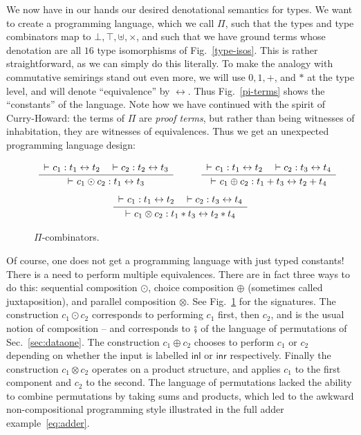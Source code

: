 \documentclass{article}
\newcommand{\iso}{\leftrightarrow}
\newcommand{\proves}{\vdash}
\newcommand{\Rule}[4]{
\makebox{{\rm #1}
$\displaystyle
\frac{\begin{array}{l}#2 \\\end{array}}
{\begin{array}{l}#3      \\\end{array}}$
 #4}}
\newcommand{\jdg}[3]{#2 \proves_{#1} #3}
\begin{document}
We now have in our hands our desired denotational semantics for types.
We want to create a programming language, which we call $\Pi$, such
that the types and type combinators map to
$\bot, \top, \uplus, \times$, and such that we have ground terms whose
denotation are all $16$ type isomorphisms of
Fig.~\ref{type-isos}. This is rather straightforward, as we can simply
do this literally. To make the analogy with commutative semirings
stand out even more, we will use $0, 1, +$, and $*$ at the type level,
and will denote ``equivalence'' by $\iso$.  Thus Fig.~\ref{pi-terms}
shows the ``constants'' of the language. Note how we have continued
with the spirit of Curry-Howard: the terms of $\Pi$ are \emph{proof
  terms}, but rather than being witnesses of inhabitation, they are
witnesses of equivalences. Thus we get an unexpected programming
language design:

\begin{center}
\end{center}
\vspace*{3mm}

\begin{figure}[t]
\[
\Rule{}
{\jdg{}{}{c_1 : t_1 \iso t_2} \quad \vdash c_2 : t_2 \iso t_3}
{\jdg{}{}{c_1 \odot c_2 : t_1 \iso t_3}}
{}
\qquad
\Rule{}
{\jdg{}{}{c_1 : t_1 \iso t_2} \quad \vdash c_2 : t_3 \iso t_4}
{\jdg{}{}{c_1 \oplus c_2 : t_1 + t_3 \iso t_2 + t_4}}
{}
\]
\[
\Rule{}
{\jdg{}{}{c_1 : t_1 \iso t_2} \quad \vdash c_2 : t_3 \iso t_4}
{\jdg{}{}{c_1 \otimes c_2 : t_1 * t_3 \iso t_2 * t_4}}
{}
\]
\caption{$\Pi$-combinators.}
\label{pi-combinators}
\end{figure}

\noindent
Of course, one does not get a programming language with just typed
constants! There is a need to perform multiple equivalences. There are
in fact three ways to do this: sequential composition $\odot$, choice
composition $\oplus$ (sometimes called juxtaposition), and parallel
composition $\otimes$. See Fig.~\ref{pi-combinators} for the
signatures. The construction $c_1 \odot c_2$ corresponds to performing
$c_1$ first, then $c_2$, and is the usual notion of composition -- and
corresponds to $\fatsemi$ of the language of permutations of
Sec.~\ref{sec:dataone}. The construction $c_1 \oplus c_2$ chooses to
perform $c_1$ or $c_2$ depending on whether the input is labelled
$\textsf{inl}$ or $\textsf{inr}$ respectively. Finally the
construction $c_1 \otimes c_2$ operates on a product structure, and
applies $c_1$ to the first component and $c_2$ to the second. The
language of permutations lacked the ability to combine permutations by
taking sums and products, which led to the awkward non-compositional
programming style illustrated in the full adder example~\ref{eq:adder}.
\end{document}
